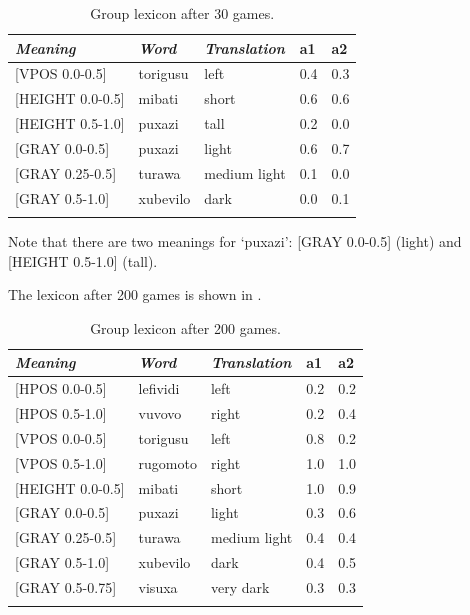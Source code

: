 \begin{table} 
\begin{center}
\begin{tabular}{ l  l  l  l  l }
\lsptoprule
{\itshape Meaning}&{\itshape Word}&{\itshape Translation} & {\bfshape  a1}&{\bfshape  a2} \\ \midrule
{}[VPOS 0.0-0.5] &torigusu&left&0.4&0.3\\ 
{}[HEIGHT 0.0-0.5]&mibati&short &0.6&0.6\\ 
{}[HEIGHT 0.5-1.0]&puxazi&tall &0.2&0.0\\ 
{}[GRAY 0.0-0.5]& puxazi&light &0.6&0.7\\ 
{}[GRAY 0.25-0.5]&turawa&medium light&0.1&0.0\\ 
{}[GRAY 0.5-1.0]& xubevilo&dark &0.0&0.1\\ 
\lspbottomrule
\end{tabular}
\caption{\label{tab:after30} Group lexicon after 30 games.}
\end{center}
\end{table}

Note that there are two meanings for `puxazi': 
{}[GRAY 0.0-0.5] (light) and [HEIGHT 0.5-1.0] (tall). 

The lexicon after 200 games is shown in . 


\begin{table} 
\begin{center}
\begin{tabular}{ l  l  l  l  l }
\lsptoprule
{\itshape Meaning}&{\itshape Word}&{\itshape Translation} & {\bfshape  a1}&{\bfshape  a2} \\ \midrule
{}[HPOS 0.0-0.5] &lefividi&left&0.2&0.2\\ 
{}[HPOS 0.5-1.0] &vuvovo&right&0.2&0.4\\ 
{}[VPOS 0.0-0.5] &torigusu&left&0.8&0.2\\ 
{}[VPOS 0.5-1.0] &rugomoto&right&1.0&1.0\\ 
{}[HEIGHT 0.0-0.5]&mibati&short &1.0&0.9\\ 
{}[GRAY 0.0-0.5]& puxazi&light &0.3&0.6\\ 
{}[GRAY 0.25-0.5]&turawa&medium light&0.4&0.4\\ 
{}[GRAY 0.5-1.0]& xubevilo&dark &0.4&0.5\\ 
{}[GRAY 0.5-0.75]& visuxa&very dark &0.3&0.3\\ 
\lspbottomrule
\end{tabular}
\caption{\label{tab:after200} Group lexicon after 200 games.}
\end{center}
\end{table}

